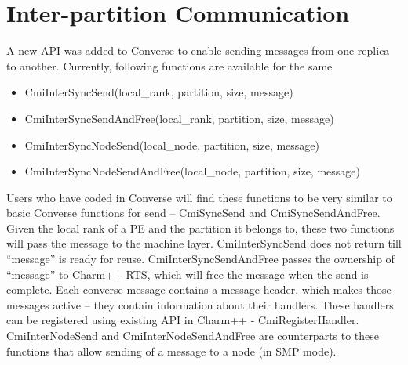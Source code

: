 \section{Inter-partition Communication}

A new API was added to Converse to enable sending messages from one replica to
another. Currently, following functions are available for the same
\begin{itemize}
\item CmiInterSyncSend(local\_rank, partition, size, message)        
\item CmiInterSyncSendAndFree(local\_rank, partition, size, message)
\item CmiInterSyncNodeSend(local\_node, partition, size, message)        
\item CmiInterSyncNodeSendAndFree(local\_node, partition, size, message)
\end{itemize}

Users who have coded in Converse will find these functions to be very similar
to basic Converse functions for send – CmiSyncSend and CmiSyncSendAndFree.
Given the local rank of a PE and the partition it belongs to, these two
functions will pass the message to the machine layer. CmiInterSyncSend does
not return till “message” is ready for reuse. CmiInterSyncSendAndFree passes
the ownership of “message” to Charm++ RTS, which will free the message when
the send is complete. Each converse message contains a message header, which
makes those messages active – they contain information about their handlers.
These handlers can be registered using existing API in Charm++ -
CmiRegisterHandler.  CmiInterNodeSend and CmiInterNodeSendAndFree are
counterparts to these functions that allow sending of a message to a node (in
    SMP mode).


